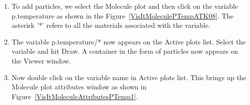 \begin{enumerate}

\item To add particles, we select the Molecule plot and then click on
  the variable p.temperature as shown in the
  Figure~\ref{VisItMoleculePTempATK08}. The asterisk '*' refers to all
  the materials associated with the variable.


\item The variable p.temperature/* now appears on the Active plots
  list. Select the variable and hit Draw. A container in the form of
  particles now appears on the Viewer window.

\item Now double click on the variable name in Active plots list. This
  brings up the Molecule plot attributes window as shown in
  Figure~\ref{VisItMoleculeAttributesPTemp1}.

\end{enumerate}


\begin{figure}[h]
  \centering
  \vspace{-10pt}
  \hspace{10pt}
 \hspace{10pt}
 \vspace{-10pt}
  \caption{}
  \label{}
\end{figure}



